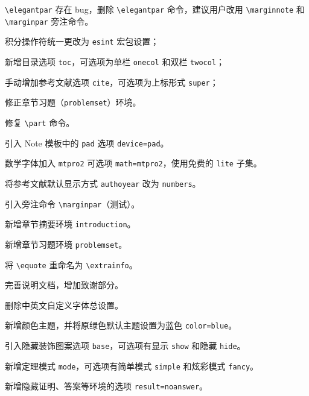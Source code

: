 \documentclass[lang=cn,10pt,cite=super]{elegantbook}
\begin{document}
\begin{change}
  \item \lstinline{\elegantpar} 存在 bug，删除 \lstinline{\elegantpar} 命令，建议用户改用 \lstinline{\marginnote} 和 \lstinline{\marginpar} 旁注命令。
  \item 积分操作符统一更改为 \lstinline{esint} 宏包设置；
  \item 新增目录选项 \lstinline{toc}，可选项为单栏 \lstinline{onecol} 和双栏 \lstinline{twocol}；
  \item 手动增加参考文献选项 \lstinline{cite}，可选项为上标形式 \lstinline{super}；
  \item 修正章节习题（\lstinline{problemset}）环境。
\end{change}


\begin{change}
  \item 修复 \lstinline{\part} 命令。
  \item 引入 Note 模板中的 \lstinline{pad} 选项 \lstinline{device=pad}。
  \item 数学字体加入 \lstinline{mtpro2} 可选项 \lstinline{math=mtpro2}，使用免费的 \lstinline{lite} 子集。
  \item 将参考文献默认显示方式 \lstinline{authoyear} 改为 \lstinline{numbers}。
  \item 引入旁注命令 \lstinline{\marginpar}（测试）。
  \item 新增章节摘要环境 \lstinline{introduction}。
  \item 新增章节习题环境 \lstinline{problemset}。
  \item 将 \lstinline{\equote} 重命名为 \lstinline{\extrainfo}。
  \item 完善说明文档，增加致谢部分。
\end{change}


\begin{change}
  \item 删除中英文自定义字体总设置。
  \item 新增颜色主题，并将原绿色默认主题设置为蓝色 \lstinline{color=blue}。
  \item 引入隐藏装饰图案选项 \lstinline{base}，可选项有显示 \lstinline{show} 和隐藏 \lstinline{hide}。
  \item 新增定理模式 \lstinline{mode}，可选项有简单模式 \lstinline{simple} 和炫彩模式 \lstinline{fancy}。
  \item 新增隐藏证明、答案等环境的选项 \lstinline{result=noanswer}。
\end{change}
\end{document}
